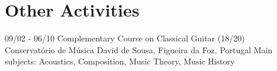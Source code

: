 \documentclass[]{friggeri-cv}
\begin{document}
\section{Other Activities}
\begin{entrylist}
  \entry
    {09/02 - 06/10}
    {Complementary Course on Classical Guitar (18/20)}
    {\\Conservatório de Música David de Sousa, Figueira da Foz, Portugal}
    {Main subjects: Acoustics, Composition, Music Theory, Music History}
\end{entrylist}
%
% 
%
\end{document}
